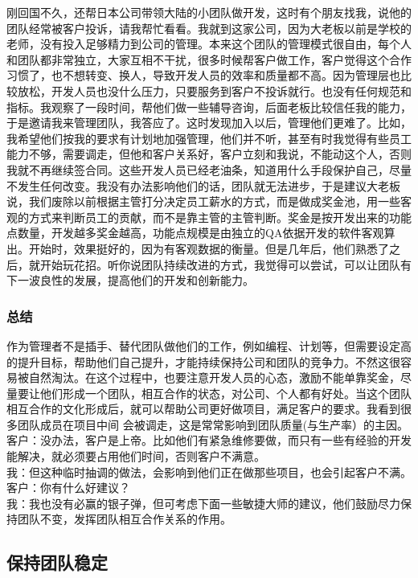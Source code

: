 刚回国不久，还帮日本公司带领大陆的小团队做开发，这时有个朋友找我，说他的团队经常被客户投诉，请我帮忙看看。我就到这家公司，因为大老板以前是学校的老师，没有投入足够精力到公司的管理。本来这个团队的管理模式很自由，每个人和团队都非常独立，大家互相不干扰，很多时候帮客户做工作，客户觉得这个合作习惯了，也不想转变、换人，导致开发人员的效率和质量都不高。因为管理层也比较放松，开发人员也没什么压力，只要服务到客户不投诉就行。也没有任何规范和指标。我观察了一段时间，帮他们做一些辅导咨询，后面老板比较信任我的能力，于是邀请我来管理团队，我答应了。这时发现加入以后，管理他们更难了。比如，我希望他们按我的要求有计划地加强管理，他们并不听，甚至有时我觉得有些员工能力不够，需要调走，但他和客户关系好，客户立刻和我说，不能动这个人，否则我就不再继续签合同。这些开发人员已经老油条，知道用什么手段保护自己，尽量不发生任何改变。我没有办法影响他们的话，团队就无法进步，于是建议大老板说，我们废除以前根据主管打分决定员工薪水的方式，而是做成奖金池，用一些客观的方式来判断员工的贡献，而不是靠主管的主管判断。奖金是按开发出来的功能点数量，开发越多奖金越高，功能点规模是由独立的QA依据开发的软件客观算出。开始时，效果挺好的，因为有客观数据的衡量。但是几年后，他们熟悉了之后，就开始玩花招。听你说团队持续改进的方式，我觉得可以尝试，可以让团队有下一波良性的发展，提高他们的开发和创新能力。

\hypertarget{ux603bux7ed3}{%
\subsubsection{总结}\label{ux603bux7ed3}}

作为管理者不是插手、替代团队做他们的工作，例如编程、计划等，但需要设定高的提升目标，帮助他们自己提升，才能持续保持公司和团队的竞争力。不然这很容易被自然淘汰。在这个过程中，也要注意开发人员的心态，激励不能单靠奖金，尽量要让他们形成一个团队，相互合作的状态，对公司、个人都有好处。当这个团队相互合作的文化形成后，就可以帮助公司更好做项目，满足客户的要求。我看到很多团队成员在项目中间
会被调走，这是常常影响到团队质量(与生产率）的主因。\\
客户：没办法，客户是上帝。比如他们有紧急维修要做，而只有一些有经验的开发能解决，就必须要占用他们时间，否则客户不满意。\\
我：但这种临时抽调的做法，会影响到他们正在做那些项目，也会引起客户不满。\\
客户：你有什么好建议？\\
我：我也没有必赢的银子弹，但可考虑下面一些敏捷大师的建议，他们鼓励尽力保持团队不变，发挥团队相互合作关系的作用。\\

\hypertarget{ux4fddux6301ux56e2ux961fux7a33ux5b9a}{%
\subsection{保持团队稳定}\label{ux4fddux6301ux56e2ux961fux7a33ux5b9a}}

